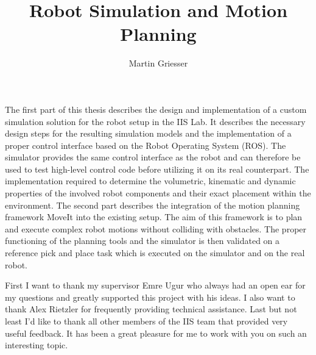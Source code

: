 \documentclass[bachelor]{iisthesis}
\title{Robot Simulation and Motion Planning}
\author{Martin Griesser}
\begin{document}
\maketitle

The first part of this thesis describes the design and implementation of a custom simulation solution for the robot setup in the IIS Lab. It describes the necessary design steps for the resulting simulation models and the implementation of a proper control interface based on the Robot Operating System (ROS). The  simulator provides the same control interface as the robot and can therefore be used to test high-level control code before utilizing it on its real counterpart. The implementation required to determine the volumetric, kinematic and dynamic properties of the involved robot components and their exact placement within the environment. The second part describes the integration of the motion planning framework MoveIt into the existing setup. The aim of this framework is to plan and execute complex robot motions without colliding with obstacles. The proper functioning of the planning tools and the simulator is then validated on a reference pick and place task which is executed on the simulator and on the real robot.


First I want to thank my supervisor Emre Ugur who always had an open ear for my questions and greatly supported this project with his ideas. I also want to thank Alex Rietzler for frequently providing technical assistance. Last but not least I'd like to thank all other members of the IIS team that  provided very useful feedback. It has been a great pleasure for me to work with you on such an interesting topic.

\tableofcontents
\listoffigures
\listoftables

\uibkdeclaration
\label{chap:declare}








\appendix%


\end{document}
